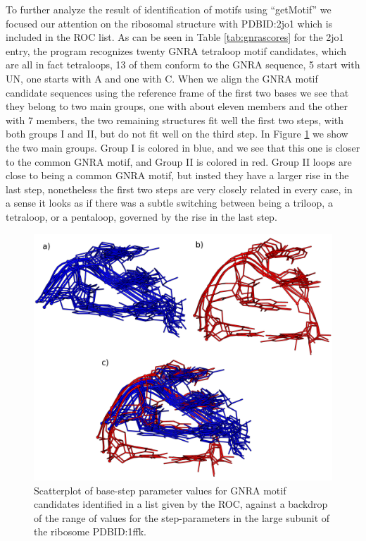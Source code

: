 To  further  analyze the  result  of  identification  of motifs  using
``getMotif'' we focused our  attention on the ribosomal structure with
PDBID:2jo1 which is included in the ROC list.  As can be seen in Table
\ref{tab:gnrascores} for the 2jo1 entry, the program recognizes twenty
GNRA tetraloop motif candidates, which  are all in fact tetraloops, 13
of them conform to the GNRA sequence, 5 start with UN, one starts with
A and  one with C.  When  we align the GNRA  motif candidate sequences
using the  reference frame  of the  first two bases  we see  that they
belong to two main groups, one with about eleven members and the other
with 7  members, the two remaining  structures fit well  the first two
steps, with  both groups I and  II, but do  not fit well on  the third
step. In Figure \ref{fig:groupsB} we show the two main groups. Group I
is colored in blue,  and we see that this one is  closer to the common
GNRA motif, and  Group II is colored in red. Group  II loops are close
to being  a common GNRA motif, but  insted they have a  larger rise in
the  last step,  nonetheless  the  first two  steps  are very  closely
related in every  case, in a sense  it looks as if there  was a subtle
switching  between  being a  triloop,  a  tetraloop,  or a  pentaloop,
governed by the rise in the last step.

\begin{figure}
\centering 
\includegraphics[angle=0, scale=0.5]{Chapter5/groupsB.png}
\caption{Scatterplot  of  base-step parameter  values  for GNRA  motif
  candidates identified in a list given by the ROC, against a backdrop
  of the range of values  for the step-parameters in the large subunit
  of the ribosome PDBID:1ffk.}
\label{fig:groupsB}
\end{figure}


